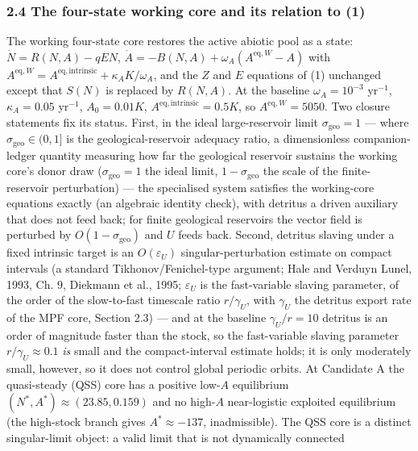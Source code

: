 \documentclass[11pt]{article}
\begin{document}
\subsubsection{2.4 The four-state working core and its relation to
(1)}\label{the-four-state-working-core-and-its-relation-to-1}

The working four-state core restores the active abiotic pool as a state:
\(\dot N = R(N,A) - qEN\),
\(\dot A = -B(N,A) + \omega_A(A^{\mathrm{eq},W} - A)\) with
\(A^{\mathrm{eq},W} = A^{\mathrm{eq,intrinsic}} + \kappa_A K/\omega_A\),
and the \(Z\) and \(E\) equations of (1) unchanged except that \(S(N)\)
is replaced by \(R(N,A)\). At the baseline \(\omega_A = 10^{-3}\)
yr\(^{-1}\), \(\kappa_A = 0.05\) yr\(^{-1}\), \(A_0 = 0.01K\),
\(A^{\mathrm{eq,intrinsic}} = 0.5K\), so \(A^{\mathrm{eq},W} = 5050\).
Two closure statements fix its status. First, in the ideal
large-reservoir limit \(\sigma_{\mathrm{geo}} = 1\) --- where
\(\sigma_{\mathrm{geo}} \in (0,1]\) is the geological-reservoir adequacy
ratio, a dimensionless companion-ledger quantity measuring how far the
geological reservoir sustains the working core's donor draw
(\(\sigma_{\mathrm{geo}} = 1\) the ideal limit,
\(1 - \sigma_{\mathrm{geo}}\) the scale of the finite-reservoir
perturbation) --- the specialised system satisfies the working-core
equations exactly (an algebraic identity check), with detritus a driven
auxiliary that does not feed back; for finite geological reservoirs the
vector field is perturbed by \(O(1 - \sigma_{\mathrm{geo}})\) and \(U\)
feeds back. Second, detritus slaving under a fixed intrinsic target is
an \(O(\varepsilon_U)\) singular-perturbation estimate on compact
intervals (a standard Tikhonov/Fenichel-type argument; Hale and Verduyn
Lunel, 1993, Ch. 9, Diekmann et al., 1995; \(\varepsilon_U\) is the
fast-variable slaving parameter, of the order of the slow-to-fast
timescale ratio \(r/\gamma_U\), with \(\gamma_U\) the detritus export
rate of the MPF core, Section 2.3) --- and at the baseline
\(\gamma_U/r = 10\) detritus is an order of magnitude faster than the
stock, so the fast-variable slaving parameter \(r/\gamma_U \approx 0.1\)
\emph{is} small and the compact-interval estimate holds; it is only
moderately small, however, so it does not control global periodic
orbits. At Candidate A the quasi-steady (QSS) core has a positive
low-\(A\) equilibrium \((N^*, A^*) \approx (23.85, 0.159)\) and no
high-\(A\) near-logistic exploited equilibrium (the high-stock branch
gives \(A^* \approx -137\), inadmissible). The QSS core is a distinct
singular-limit object: a valid limit that is not dynamically connected
\end{document}
